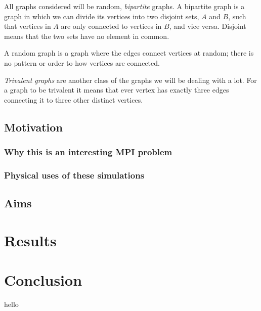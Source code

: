 \documentclass[pdftex,12pt,a4paper]{article}
\begin{document}
All graphs considered will be random, \emph{bipartite} graphs. A bipartite graph is a graph in which we can divide its vertices into two disjoint sets, $A$ and $B$, such that vertices in $A$ are only connected to vertices in $B$, and vice versa. Disjoint means that the two sets have no element in common.

A random graph is a graph where the edges connect vertices at random; there is no pattern or order to how vertices are connected.

\emph{Trivalent graphs} are another class of the graphs we will be dealing with a lot. For a graph to be trivalent it means that ever vertex has exactly three edges connecting it to three other distinct vertices. 


\subsection{Motivation}


\subsubsection{Why this is an interesting MPI problem}


\subsubsection{Physical uses of these simulations}


\subsection{Aims}



\newpage

\section{Results}



\newpage

\section{Conclusion}

hello
\end{document}
